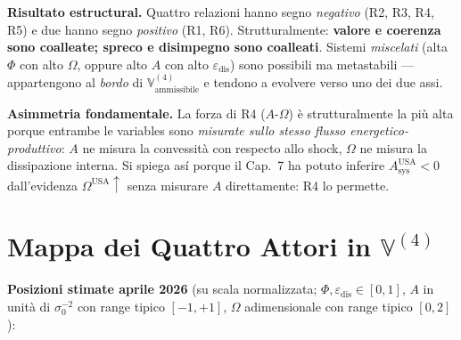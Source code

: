 \Proved{} \textbf{Risultato estructural.} Quattro relazioni hanno segno
\emph{negativo} (R2, R3, R4, R5) e due hanno segno \emph{positivo} (R1,
R6). Strutturalmente: \textbf{valore e coerenza sono coalleate; spreco e
disimpegno sono coalleati}. Sistemi \emph{miscelati} (alta \(\Phi\) con
alto \(\Omega\), oppure alto \(A\) con alto
\(\varepsilon_{\text{dis}}\)) sono possibili ma metastabili ---
appartengono al \emph{bordo} di
\(\mathbb{V}^{(4)}_{\text{ammissibile}}\) e tendono a evolvere verso uno
dei due assi.

\Hypoth{} \textbf{Asimmetria fondamentale.} La forza di R4
(\(A\)-\(\Omega\)) è strutturalmente la più alta porque entrambe le
variables sono \emph{misurate sullo stesso flusso
energetico-produttivo}: \(A\) ne misura la convessità con respecto allo
shock, \(\Omega\) ne misura la dissipazione interna. Si spiega así
porque il Cap.~7 ha potuto inferire \(A_{\text{sys}}^{\text{USA}} < 0\)
dall'evidenza \(\Omega^{\text{USA}} \uparrow\) senza misurare \(A\)
direttamente: R4 lo permette.



\section{\texorpdfstring{Mappa dei Quattro Attori in
\(\mathbb{V}^{(4)}\)}{Mappa dei Quattro Attori in \textbackslash mathbb\{V\}\^{}\{(4)\}}}\label{mappa-dei-quattro-attori-in-mathbbv4}

\Proved{} \textbf{Posizioni stimate aprile 2026} (su scala normalizzata;
\(\Phi, \varepsilon_{\text{dis}} \in [0,1]\), \(A\) in unità di
\(\sigma_0^{-2}\) con range tipico \([-1, +1]\), \(\Omega\)
adimensionale con range tipico \([0, 2]\)):

